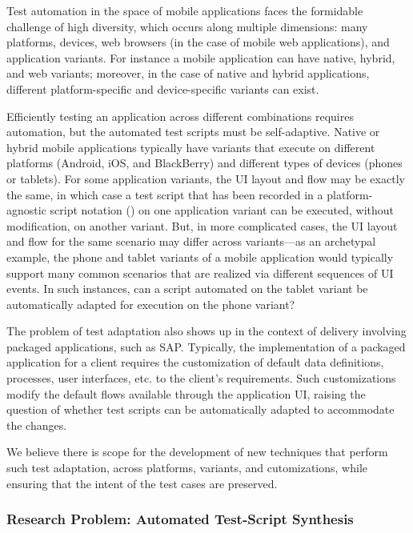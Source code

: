 Test automation in the space of mobile applications faces the form\-idable
challenge of high diversity, which occurs along multiple dimensions: many
platforms, devices, web browsers (in the case of mobile web applications), and
application variants. For instance a mobile application can have native, hybrid,
and web variants; moreover, in the case of native and hybrid applications,
different platform-specific and device-specific variants can exist.

Efficiently testing an application across different combinations requires
automation, but the automated test scripts must be self-adaptive. Native or
hybrid mobile applications typically have variants that execute on different
platforms (\eg Android, iOS, and BlackBerry) and different types of devices
(phones or tablets). For some application variants, the UI layout and flow may
be exactly the same, in which case a test script that has been recorded in a
platform-agnostic script notation (\eg \cite{PerfectoScriptOnce}) on one
application variant can be executed, without modification, on another
variant. But, in more complicated cases, the UI layout and flow for the same
scenario may differ across variants---as an archetypal example, the phone and
tablet variants of a mobile application would typically support many common
scenarios that are realized via different sequences of UI events. In such
instances, can a script automated on the tablet variant be automatically adapted
for execution on the phone variant?

The problem of test adaptation also shows up in the context of delivery
involving packaged applications, such as SAP. Typically, the implementation of a
packaged application for a client requires the customization of default data
definitions, processes, user interfaces, etc. to the client's requirements. Such
customizations modify the default flows available through the application UI,
raising the question of whether test scripts can be automatically adapted to
accommodate the changes.

We believe there is scope for the development of new techniques that perform
such test adaptation, across platforms, variants, and cutomizations, while
ensuring that the intent of the test cases are preserved.

\subsubsection*{Research Problem: Automated Test-Script Synthesis}

